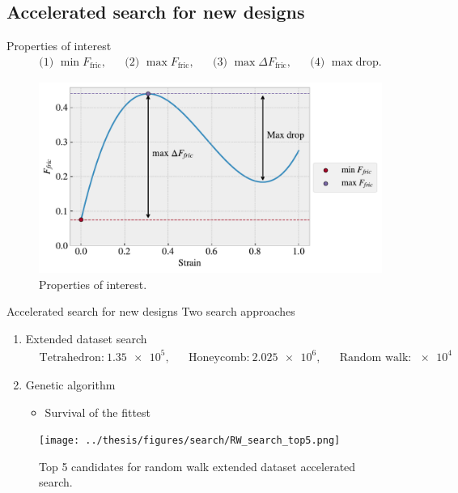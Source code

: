 \documentclass[
	10pt, %
]{beamer}
\begin{document}
%
%
\subsection{Accelerated search for new designs}
\begin{frame}{Properties of interest}
	\begin{align*}
		&\text{(1) } \min F_{\text{fric}},& &\text{(2) } \max F_{\text{fric}},& &\text{(3) } \max \Delta F_{\text{fric}},& &\text{(4) } \max \text{drop}.&
	\end{align*}
	\begin{figure}[H]
		\centering
		\includegraphics[width=0.8\linewidth]{figures/prop_of_interets.pdf}
		\caption{Properties of interest.}
	\end{figure}
\end{frame}
%
%
\begin{frame}{Accelerated search for new designs}
	Two search approaches
	\begin{enumerate}
		\item Extended dataset search
		\begin{align*}
			&\text{Tetrahedron:} \ \num{1.35e5},& &\text{Honeycomb:} \ \num{2.025e6},& &\text{Random walk:} \ \num{e4}&
		\end{align*}
		\item Genetic algorithm
		\begin{itemize}
			\item Survival of the fittest 
		\end{itemize}
	\end{enumerate}

	\begin{figure}[H]
		\centering
		\texttt{[image: ../thesis/figures/search/RW\_search\_top5.png]}
		\caption{Top 5 candidates for random walk extended dataset accelerated search. }
	\end{figure}  
\end{frame}
%
%
\end{document}
